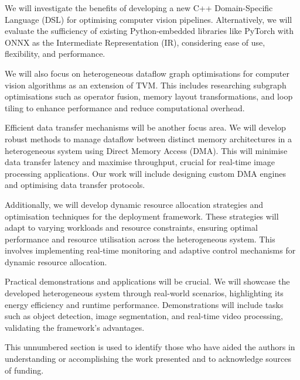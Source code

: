 \documentclass[]{spie}  %
\begin{document}
We will investigate the benefits of developing a new C++ Domain-Specific Language (DSL) for optimising computer vision pipelines. Alternatively, we will evaluate the sufficiency of existing Python-embedded libraries like PyTorch with ONNX as the Intermediate Representation (IR), considering ease of use, flexibility, and performance.

We will also focus on heterogeneous dataflow graph optimisations for computer vision algorithms as an extension of TVM. This includes researching subgraph optimisations such as operator fusion, memory layout transformations, and loop tiling to enhance performance and reduce computational overhead.

Efficient data transfer mechanisms will be another focus area. We will develop robust methods to manage dataflow between distinct memory architectures in a heterogeneous system using Direct Memory Access (DMA). This will minimise data transfer latency and maximise throughput, crucial for real-time image processing applications. Our work will include designing custom DMA engines and optimising data transfer protocols.

Additionally, we will develop dynamic resource allocation strategies and optimisation techniques for the deployment framework. These strategies will adapt to varying workloads and resource constraints, ensuring optimal performance and resource utilisation across the heterogeneous system. This involves implementing real-time monitoring and adaptive control mechanisms for dynamic resource allocation.

Practical demonstrations and applications will be crucial. We will showcase the developed heterogeneous system through real-world scenarios, highlighting its energy efficiency and runtime performance. Demonstrations will include tasks such as object detection, image segmentation, and real-time video processing, validating the framework's advantages.





\acknowledgments %
 
This unnumbered section is used to identify those who have aided the authors in understanding or accomplishing the work presented and to acknowledge sources of funding.  

\end{document}
